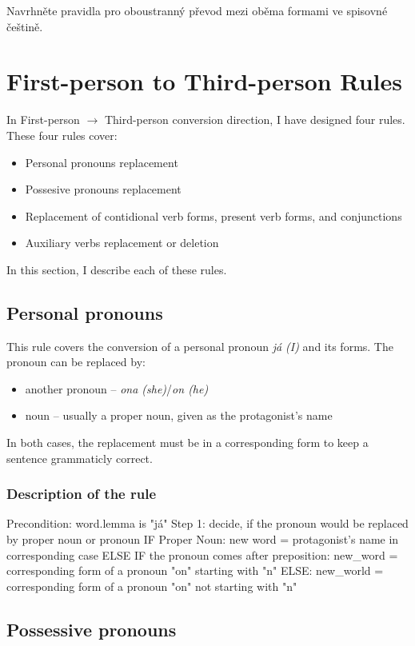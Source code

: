 Navrhněte pravidla pro oboustranný převod mezi oběma formami ve spisovné češtině.


\section{First-person to Third-person Rules}
In First-person $\rightarrow$ Third-person conversion direction, I have designed four rules. These four rules cover:
	\begin{itemize}
		\item Personal pronouns replacement
		\item Possesive pronouns replacement
		\item Replacement of contidional verb forms, present verb forms, and conjunctions
		\item Auxiliary verbs replacement or deletion
	\end{itemize}

In this section, I describe each of these rules.

\subsection{Personal pronouns}

This rule covers the conversion of a personal pronoun \emph{já (I)} and its forms. The pronoun can be replaced by:
	\begin{itemize}
		\item another pronoun -- \emph{ona (she)}/\emph{on (he)}
		\item noun -- usually a proper noun, given as the protagonist's name
	\end{itemize}
In both cases, the replacement must be in a corresponding form to keep a sentence grammaticly correct.

\subsubsection{Description of the rule}

\begin{listings}
	Precondition: word.lemma is "já"
	Step 1: decide, if the pronoun would be replaced by proper noun or pronoun
	IF Proper Noun:
		new word = protagonist's name in corresponding case
	ELSE IF the pronoun comes after preposition:
		new\_word = corresponding form of a pronoun "on" starting with "n"
	ELSE:
		new\_world = corresponding form of a pronoun "on" not starting with "n"
\end{listings}

\subsection{Possessive pronouns}

